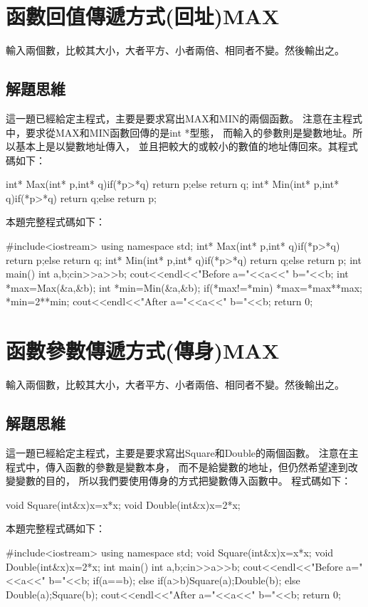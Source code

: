 \section{函數回值傳遞方式(回址)MAX}
輸入兩個數，比較其大小，大者平方、小者兩倍、相同者不變。然後輸出之。

\subsection{解題思維}
這一題已經給定主程式，主要是要求寫出MAX和MIN的兩個函數。
注意在主程式中，要求從MAX和MIN函數回傳的是int *型態，
而輸入的參數則是變數地址。所以基本上是以變數地址傳入，
並且把較大的或較小的數值的地址傳回來。其程式碼如下：
\begin{inside}
int* Max(int* p,int* q){if(*p>*q) return p;else return q;}
int* Min(int* p,int* q){if(*p>*q) return q;else return p;}
\end{inside}

本題完整程式碼如下：
\begin{cppcode}
#include<iostream>
using namespace std;
int* Max(int* p,int* q){if(*p>*q) return p;else return q;}
int* Min(int* p,int* q){if(*p>*q) return q;else return p;}
int main(){
	int a,b;cin>>a>>b;
	cout<<endl<<"Before a="<<a<<" b="<<b;
	int *max=Max(&a,&b);
	int *min=Min(&a,&b);
	if(*max!=*min){
		*max=*max**max;
		*min=2**min;
	}
	cout<<endl<<"After a="<<a<<" b="<<b;
	return 0;
}
\end{cppcode}


\section{函數參數傳遞方式(傳身)MAX}
輸入兩個數，比較其大小，大者平方、小者兩倍、相同者不變。然後輸出之。

\subsection{解題思維}
這一題已經給定主程式，主要是要求寫出Square和Double的兩個函數。
注意在主程式中，傳入函數的參數是變數本身，
而不是給變數的地址，但仍然希望達到改變變數的目的，
所以我們要使用傳身的方式把變數傳入函數中。
程式碼如下：
\begin{inside}
void Square(int&x){x=x*x;}
void Double(int&x){x=2*x;}
\end{inside}

本題完整程式碼如下：
\begin{cppcode}
#include<iostream>
using namespace std;
void Square(int&x){x=x*x;}
void Double(int&x){x=2*x;}
int main(){
	int a,b;cin>>a>>b;
	cout<<endl<<"Before a="<<a<<" b="<<b;
	if(a==b);
	else if(a>b){Square(a);Double(b);}
	else {Double(a);Square(b);}
	cout<<endl<<"After a="<<a<<" b="<<b;
	return 0;
}
\end{cppcode}

